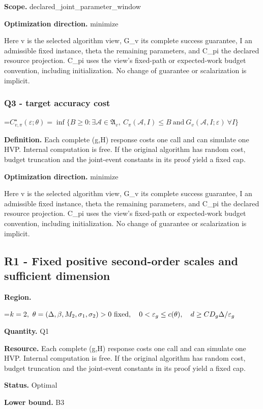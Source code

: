 \documentclass[10pt,a4paper]{article}
\newcommand{\AtlasMath}[1]{\par\begingroup\centering\setbox0=\hbox{$\displaystyle #1$}\ifdim\wd0>1.4\linewidth\typeout{ATLAS WIDE FORMULA: \the\wd0}\fi\ifdim\wd0>\linewidth\resizebox{\linewidth}{!}{\box0}\else\box0\fi\par\endgroup}
\begin{document}
\textbf{Scope.} declared\_joint\_parameter\_window

\textbf{Optimization direction.} minimize

Here v is the selected algorithm view, G\_v its complete success guarantee, I an admissible fixed instance, theta the remaining parameters, and C\_pi the declared resource projection. C\_pi uses the view's fixed-path or expected-work budget convention, including initialization. No change of guarantee or scalarization is implicit.

\subsubsection{Q3 - target accuracy cost}
\AtlasMath{C^\star_{v,\pi}(\varepsilon;\theta)=\inf\{B\ge0:\exists\mathcal A\in\mathfrak A_v,\ C_\pi(\mathcal A,I)\le B\ \text{and}\ G_v(\mathcal A,I;\varepsilon)\ \forall I\}}
\textbf{Definition.} Each complete (g,H) response costs one call and can simulate one HVP. Internal computation is free. If the original algorithm has random cost, budget truncation and the joint-event constants in its proof yield a fixed cap.

\textbf{Optimization direction.} minimize

Here v is the selected algorithm view, G\_v its complete success guarantee, I an admissible fixed instance, theta the remaining parameters, and C\_pi the declared resource projection. C\_pi uses the view's fixed-path or expected-work budget convention, including initialization. No change of guarantee or scalarization is implicit.

\subsection{R1 - Fixed positive second-order scales and sufficient dimension}
\textbf{Region.} 
\AtlasMath{k=2,\ \theta=(\Delta,\beta,M_2,\sigma_1,\sigma_2)>0\ {\rm fixed},\quad0<\varepsilon_g\le c(\theta),\quad d\ge C D_g\Delta/\varepsilon_g}


\textbf{Quantity.} Q1

\textbf{Resource.} Each complete (g,H) response costs one call and can simulate one HVP. Internal computation is free. If the original algorithm has random cost, budget truncation and the joint-event constants in its proof yield a fixed cap.

\textbf{Status.} Optimal

\textbf{Lower bound.} B3
\end{document}
